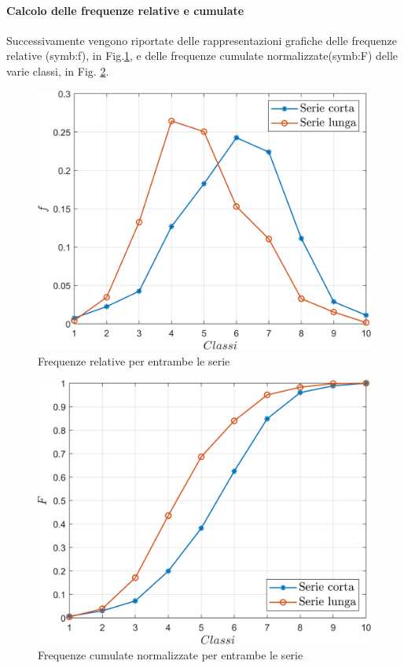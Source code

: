\paragraph{Calcolo delle frequenze relative e cumulate}
Successivamente vengono riportate delle rappresentazioni grafiche 
delle frequenze relative (\gls{symb:f}), in Fig.\ref{fig:relboth}, e delle frequenze cumulate normalizzate(\gls{symb:F}) delle varie classi, in Fig. \ref{fig:cumboth}.



\begin{figure}
	\centering
	\includegraphics[width=0.7\linewidth]{"../sperimentazione nei propulsori/relboth"}
	\caption{Frequenze relative per entrambe le serie}
	\label{fig:relboth}
\end{figure}


\begin{figure}
	\centering
	\includegraphics[width=0.7\linewidth]{"../sperimentazione nei propulsori/cumboth"}
	\caption{Frequenze cumulate normalizzate per entrambe le serie}
	\label{fig:cumboth}
\end{figure}



